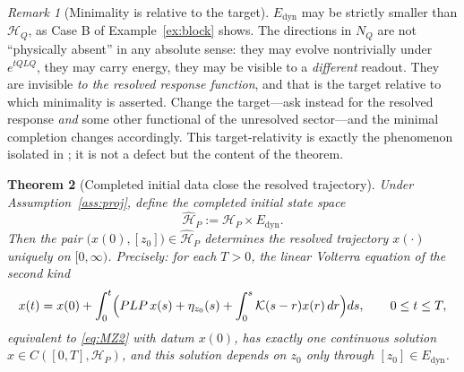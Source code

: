 \documentclass[11pt,reqno]{amsart}
\numberwithin{equation}{section}
\theoremstyle{plain}
\newtheorem{theorem}{Theorem}[section]
\theoremstyle{definition}
\theoremstyle{remark}
\newtheorem{remark}[theorem]{Remark}
\newcommand{\HP}{\mathcal{H}_{P}}
\newcommand{\HQ}{\mathcal{H}_{Q}}
\newcommand{\Edyn}{E_{\mathrm{dyn}}}
\newcommand{\Kmem}{\mathcal{K}}
\begin{document}
\begin{remark}[Minimality is relative to the target]
\label{rem:relative}
$\Edyn$ may be strictly smaller than $\HQ$, as Case B of Example~\ref{ex:block} shows. The
directions in $N_{Q}$ are not ``physically absent'' in any absolute sense: they may evolve
nontrivially under $e^{tQLQ}$, they may carry energy, they may be visible to a \emph{different}
readout. They are invisible \emph{to the resolved response function}, and that is the target
relative to which minimality is asserted. Change the target---ask instead for the resolved
response \emph{and} some other functional of the unresolved sector---and the minimal
completion changes accordingly. This target-relativity is exactly the phenomenon isolated in
\cite{Paper2}; it is not a defect but the content of the theorem.
\end{remark}

\begin{theorem}[Completed initial data close the resolved trajectory]
\label{thm:volterra}
Under Assumption~\ref{ass:proj}, define the completed initial state space
\begin{equation}
\label{eq:completedstate}
\widehat{\mathcal{H}}_{P}:=\HP\times\Edyn .
\end{equation}
Then the pair $\bigl(x(0),[z_{0}]\bigr)\in\widehat{\mathcal{H}}_{P}$ determines the resolved
trajectory $x(\cdot)$ uniquely on $[0,\infty)$. Precisely: for each $T>0$, the linear Volterra
equation of the second kind
\begin{equation}
\label{eq:volterra}
x(t)=x(0)+\int_{0}^{t}\Bigl(PLP\,x(s)+\eta_{z_{0}}(s)
+\int_{0}^{s}\Kmem(s-r)x(r)\,dr\Bigr)ds ,
\qquad 0\le t\le T,
\end{equation}
equivalent to \eqref{eq:MZ2} with datum $x(0)$, has exactly one continuous solution
$x\in C([0,T],\HP)$, and this solution depends on $z_{0}$ only through $[z_{0}]\in\Edyn$.
\end{theorem}
\end{document}
